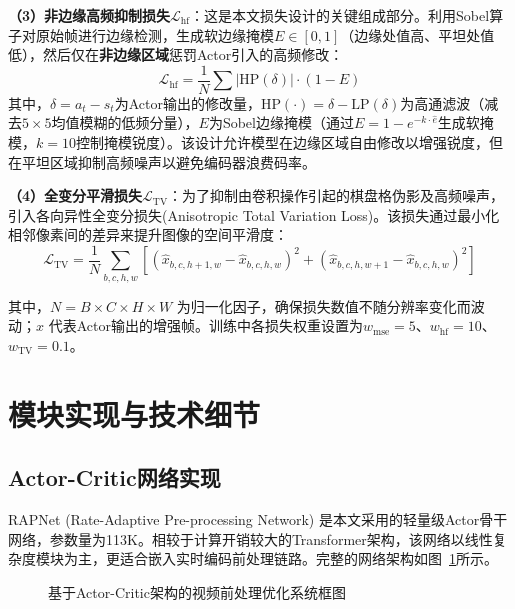 \textbf{（3）非边缘高频抑制损失}$\mathcal{L}_{\text{hf}}$：这是本文损失设计的关键组成部分。利用Sobel算子对原始帧进行边缘检测，生成软边缘掩模$E \in [0, 1]$（边缘处值高、平坦处值低），然后仅在\textbf{非边缘区域}惩罚Actor引入的高频修改：
\begin{equation}
  \mathcal{L}_{\text{hf}} = \frac{1}{N} \sum \left| \text{HP}(\delta) \right| \cdot (1 - E)
  \label{eq:hf-loss}
\end{equation}
其中，$\delta = a_t - s_t$为Actor输出的修改量，$\text{HP}(\cdot) = \delta - \text{LP}(\delta)$为高通滤波（减去$5 \times 5$均值模糊的低频分量），$E$为Sobel边缘掩模（通过$E = 1 - e^{-k \cdot \hat{e}}$生成软掩模，$k = 10$控制掩模锐度）。该设计允许模型在边缘区域自由修改以增强锐度，但在平坦区域抑制高频噪声以避免编码器浪费码率。

\textbf{（4）全变分平滑损失}$\mathcal{L}_{\text{TV}}$：为了抑制由卷积操作引起的棋盘格伪影及高频噪声，引入各向异性全变分损失(Anisotropic Total Variation Loss)。该损失通过最小化相邻像素间的差异来提升图像的空间平滑度：
\begin{equation}
  \mathcal{L}_{\text{TV}} = \frac{1}{N} \sum_{b,c,h,w} \left[ (\hat{x}_{b,c,h+1,w} - \hat{x}_{b,c,h,w})^2 + (\hat{x}_{b,c,h,w+1} - \hat{x}_{b,c,h,w})^2 \right]
  \label{eq:tv-loss}
\end{equation}

其中，$N = B \times C \times H \times W$ 为归一化因子，确保损失数值不随分辨率变化而波动；$\hat{x}$ 代表Actor输出的增强帧。训练中各损失权重设置为$w_{\text{mse}} = 5$、$w_{\text{hf}} = 10$、$w_{\text{TV}} = 0.1$。

\section{模块实现与技术细节}

\subsection{Actor-Critic网络实现}

RAPNet (Rate-Adaptive Pre-processing Network)\cite{ref27-zhao2025rapnet} 是本文采用的轻量级Actor骨干网络，参数量为113K。相较于计算开销较大的Transformer架构\cite{ref22-liang2022vrt}，该网络以线性复杂度模块为主，更适合嵌入实时编码前处理链路\cite{ref17-ma2023rateperception}。完整的网络架构如图~\ref{fig:actor-critic-system}所示。

\begin{figure}[!htbp]
  \centering
  \resizebox{0.92\textwidth}{!}{}
  \caption{基于Actor-Critic架构的视频前处理优化系统框图}
  \label{fig:actor-critic-system}
\end{figure}

